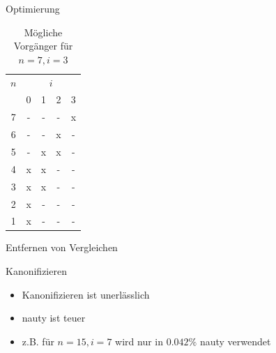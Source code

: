 \begin{frame}{Optimierung}
  \begin{table}[!t]
    \renewcommand{\arraystretch}{1.2}
    \centering
    \begin{tabular}{c|cccc}
      $n$ & \multicolumn{4}{c}{$i$}             \\
          & 0                       & 1 & 2 & 3 \\ \hline
      7   & -                       & - & - & x \\
      6   & -                       & - & x & - \\
      5   & -                       & x & x & - \\
      4   & x                       & x & - & - \\
      3   & x                       & x & - & - \\
      2   & x                       & - & - & - \\
      1   & x                       & - & - & - \\
    \end{tabular}%
    \caption{Mögliche Vorgänger für $n = 7,i = 3$}
  \end{table}
\end{frame}

\begin{frame}{Entfernen von Vergleichen}
  \centering
  
\end{frame}

\begin{frame}{Kanonifizieren}
  \begin{itemize}
    \item<+-> Kanonifizieren ist unerlässlich
    \item<+-> nauty ist teuer
    \item<+-> z.B. für $n=15,i=7$ wird nur in $0.042\%$ nauty verwendet
  \end{itemize}
\end{frame}


